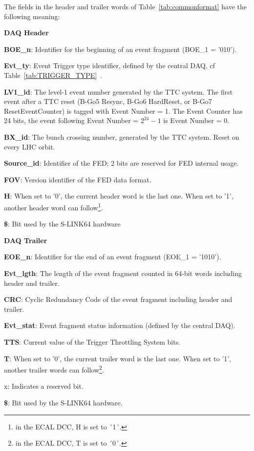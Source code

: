 The fields in the header and trailer words of
Table~\ref{tab:commonformat} have the following meaning:
\begin{description}
\item {\bf DAQ Header}
\begin{description}
\item {\bf BOE\_n}: Identifier for the beginning of an event fragment (BOE\_1 = '010').
\item {\bf Evt\_ty}: Event Trigger type identifier, defined by the central
  DAQ, cf~ Table~\ref{tab:TRIGGER_TYPE}~\cite{NOTE_2002/033}.
\item {\bf LV1\_id}: The level-1 event number generated by the TTC
  system. The first event after a TTC reset (B-Go5 Resync, B-Go6
  HardReset, or B-Go7 ResetEventCounter) is tagged with Event Number =
  1. The Event Counter has 24 bits, the event following Event Number =
  $2^{24}-1$ is Event Number = 0.
\item {\bf BX\_id}: The bunch crossing number, generated by the TTC
  system. Reset on every LHC orbit.
\item {\bf Source\_id}: Identifier of the FED; 2 bits are reserved for FED internal usage.
\item {\bf FOV}: Version identifier of the FED data format.
\item {\bf H}: When set to '0', the current header word is the last
  one. When set to '1', another header word can follow\footnote{in the
    ECAL DCC, H is set to ´1´.}.%
\item {\bf \$}: Bit used by the S-LINK64 hardware
\end{description}
\item {\bf DAQ Trailer}
\begin{description}
\item {\bf EOE\_n}: Identifier for the end of an event fragment (EOE\_1 = '1010').
\item {\bf Evt\_lgth}: The length of the event fragment counted in 64-bit words including header and trailer.
\item {\bf CRC}: Cyclic Redundancy Code of the event fragment including
  header and trailer. %
\item {\bf Evt\_stat}: Event fragment status information (defined by the central DAQ).
\item {\bf TTS}: Current value of the Trigger Throttling System bits.
\item {\bf T}: When set to '0', the current trailer word is the last one. When set to '1', another trailer words can follow\footnote{in the
    ECAL DCC, T is set to ´0´.}.%
\item x: Indicates a reserved bit.
\item {\bf \$}: Bit used by the S-LINK64 hardware.
\end{description}
\end{description}

